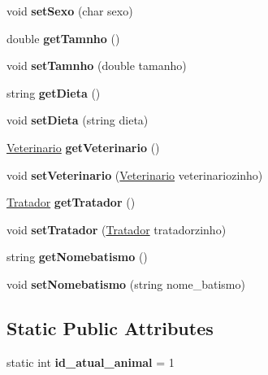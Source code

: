 \begin{DoxyCompactItemize}
\item 
\mbox{\label{classAnimal_aab32d5ad6689a4e19cfd43a303c939af}} 
void {\bfseries set\+Sexo} (char sexo)
\item 
\mbox{\label{classAnimal_ae768cb38f1c3a2d6b18387609671d087}} 
double {\bfseries get\+Tamnho} ()
\item 
\mbox{\label{classAnimal_a1000f46365765d8367cbe53c9974a85b}} 
void {\bfseries set\+Tamnho} (double tamanho)
\item 
\mbox{\label{classAnimal_a6fb3465da017e69f961d1e11dff55ad0}} 
string {\bfseries get\+Dieta} ()
\item 
\mbox{\label{classAnimal_afa020af4b8e36220d2d454982bc66ce7}} 
void {\bfseries set\+Dieta} (string dieta)
\item 
\mbox{\label{classAnimal_ad4ef5bc23ae22e3032e4aa5586a52cf9}} 
\hyperlink{classVeterinario}{Veterinario} {\bfseries get\+Veterinario} ()
\item 
\mbox{\label{classAnimal_a501a88de0b317105fb4e6a479b0acf90}} 
void {\bfseries set\+Veterinario} (\hyperlink{classVeterinario}{Veterinario} veterinariozinho)
\item 
\mbox{\label{classAnimal_ab079d7bbafb2868a80dce53ef3548184}} 
\hyperlink{classTratador}{Tratador} {\bfseries get\+Tratador} ()
\item 
\mbox{\label{classAnimal_aa5dbc070cb3d1bb5d8814b3f0dff26b6}} 
void {\bfseries set\+Tratador} (\hyperlink{classTratador}{Tratador} tratadorzinho)
\item 
\mbox{\label{classAnimal_a7b56d6d10d4bdc3a0a8789fd254369ce}} 
string {\bfseries get\+Nomebatismo} ()
\item 
\mbox{\label{classAnimal_a99db0985d3622c5e7d68c7a694e975c5}} 
void {\bfseries set\+Nomebatismo} (string nome\+\_\+batismo)
\end{DoxyCompactItemize}
\subsection*{Static Public Attributes}
\begin{DoxyCompactItemize}
\item 
\mbox{\label{classAnimal_acfe26fa20e50c5603b98dba45341b96b}} 
static int {\bfseries id\+\_\+atual\+\_\+animal} = 1
\end{DoxyCompactItemize}
